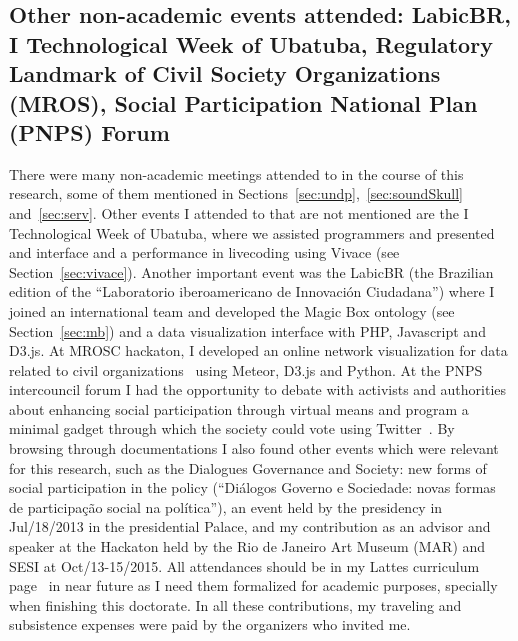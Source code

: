 \begin{apendicesenv}
\subsection{Other non-academic events attended: LabicBR, I Technological Week of Ubatuba, Regulatory Landmark of Civil Society Organizations (MROS), Social Participation National Plan (PNPS) Forum}
There were many non-academic meetings attended to in the course of this research,
some of them mentioned in Sections~\ref{sec:undp},~\ref{sec:soundSkull} and~\ref{sec:serv}.
Other events I attended to that are not mentioned are the I Technological Week of Ubatuba, where
we assisted programmers and presented and interface and a performance in livecoding using Vivace (see Section~\ref{sec:vivace}).
Another important event was the LabicBR (the Brazilian edition of the ``Laboratorio iberoamericano de Innovación Ciudadana'')
where I joined an international team and developed the Magic Box ontology (see Section~\ref{sec:mb}) and a data visualization interface
with PHP, Javascript and D3.js.
At MROSC hackaton, I developed an online network visualization for data related to civil organizations~\cite{oscEmRede} using
Meteor, D3.js and Python.
At the PNPS intercouncil forum I had the opportunity to debate with activists and authorities about enhancing social participation
through virtual means and program a minimal gadget through which the society could vote using Twitter~\cite{votoTwitter}.
By browsing through documentations I also found other events which were relevant for this research,
such as the
Dialogues Governance and Society: new forms of social participation in the policy
(``Diálogos Governo e Sociedade: novas formas de participação social na política''),
an event held by the presidency in Jul/18/2013 in the presidential Palace,
and my contribution as an advisor and speaker at the Hackaton held by the Rio de Janeiro Art Museum (MAR)
and SESI at Oct/13-15/2015.
All attendances should be in my Lattes curriculum page~\cite{myLattes} in near future as
I need them formalized for academic purposes, specially when finishing this doctorate.
In all these contributions, my traveling and subsistence expenses were paid by the organizers who invited me.


\end{apendicesenv}
